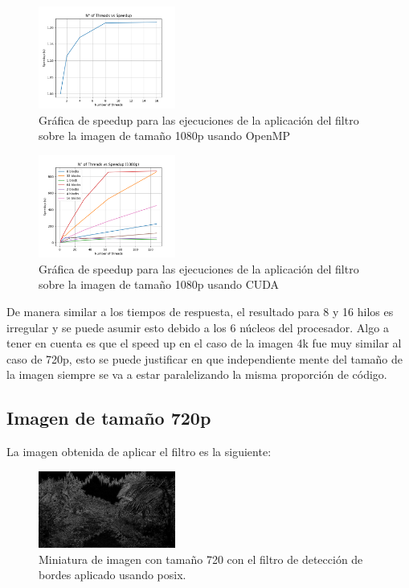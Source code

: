 \begin{figure}[H]
    \centering
    \includegraphics[width=0.4\textwidth]{../plots/omp_1080p_speedup.png}
    \caption{Gráfica de speedup para las ejecuciones de la aplicación del filtro sobre la imagen de tamaño 1080p usando OpenMP}
\end{figure}

\begin{figure}[H]
    \centering
    \includegraphics[width=0.4\textwidth]{../plots/cuda_1080p_speedup.png}
    \caption{Gráfica de speedup para las ejecuciones de la aplicación del filtro sobre la imagen de tamaño 1080p usando CUDA}
\end{figure}

De manera similar a los tiempos de respuesta, el resultado para 8 y 16 hilos es irregular y se puede asumir esto debido a los 6 núcleos del procesador. Algo a tener en cuenta es que el speed up en el caso de la imagen 4k fue muy similar al caso de 720p, esto se puede justificar en que independiente mente del tamaño de la imagen siempre se va a estar paralelizando la misma proporción de código.

\subsection{Imagen de tamaño 720p}

La imagen obtenida de aplicar el filtro es la siguiente:

\begin{figure}[H]
    \centering
    \includegraphics[width=0.4\textwidth]{../plots/720p.out.jpg}
    \caption{Miniatura de imagen con tamaño 720 con el filtro de detección de bordes aplicado usando posix.}
\end{figure}


